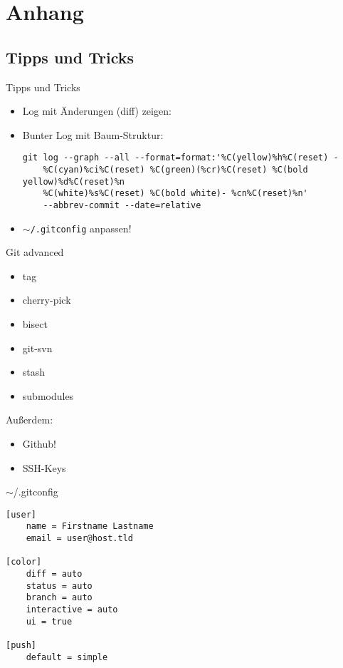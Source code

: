 \section{Anhang}

\subsection{Tipps und Tricks}
\begin{frame}[fragile]{Tipps und Tricks}
    \begin{itemize}
        \item Log mit Änderungen (diff) zeigen:
        \item Bunter Log mit Baum-Struktur:

{\scriptsize\begin{verbatim}
git log --graph --all --format=format:'%C(yellow)%h%C(reset) -
    %C(cyan)%ci%C(reset) %C(green)(%cr)%C(reset) %C(bold yellow)%d%C(reset)%n
    %C(white)%s%C(reset) %C(bold white)- %cn%C(reset)%n'
    --abbrev-commit --date=relative
\end{verbatim}}
        \item \texttt{$\sim$/.gitconfig} anpassen!
    \end{itemize}
\end{frame}

\begin{frame}{Git advanced}
    \begin{itemize}
        \item tag
        \item cherry-pick
        \item bisect
        \item git-svn
        \item stash
        \item submodules
    \end{itemize}

    Außerdem:
    \begin{itemize}
        \item Github!
        \item SSH-Keys
    \end{itemize}
\end{frame}

\begin{frame}[fragile]{$\sim$/.gitconfig}
\begin{verbatim}
[user]
    name = Firstname Lastname
    email = user@host.tld

[color]
    diff = auto
    status = auto
    branch = auto
    interactive = auto
    ui = true

[push]
    default = simple
\end{verbatim}
\end{frame}


